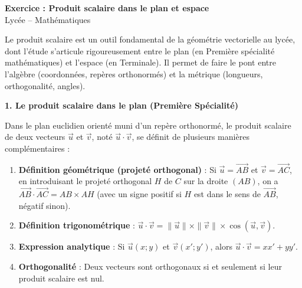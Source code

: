 \documentclass[11pt,a4paper]{article}
\begin{document}
\begin{center}
  {\LARGE \textbf{Exercice : Produit scalaire dans le plan et espace}}\\[0.5em]
  {\large Lycée -- Mathématiques}
\end{center}

Le produit scalaire est un outil fondamental de la géométrie vectorielle au lycée, dont l'étude s'articule rigoureusement entre le plan (en Première spécialité mathématiques) et l'espace (en Terminale). Il permet de faire le pont entre l'algèbre (coordonnées, repères orthonormés) et la métrique (longueurs, orthogonalité, angles).

\vspace{0.35cm}\noindent\textbf{\large 1. Le produit scalaire dans le plan (Première Spécialité)}\par\vspace{0.15cm}
Dans le plan euclidien orienté muni d'un repère orthonormé, le produit scalaire de deux vecteurs $\vec{u}$ et $\vec{v}$, noté $\vec{u} \cdot \vec{v}$, se définit de plusieurs manières complémentaires :
\begin{enumerate}
  \item \textbf{Définition géométrique (projeté orthogonal)} : Si $\vec{u} = \overrightarrow{AB}$ et $\vec{v} = \overrightarrow{AC}$, en introduisant le projeté orthogonal $H$ de $C$ sur la droite $(AB)$, on a $\overrightarrow{AB} \cdot \overrightarrow{AC} = AB \times AH$ (avec un signe positif si $H$ est dans le sens de $\vec{AB}$, négatif sinon).
  \item \textbf{Définition trigonométrique} : $\vec{u} \cdot \vec{v} = \|\vec{u}\| \times \|\vec{v}\| \times \cos(\vec{u}, \vec{v})$.
  \item \textbf{Expression analytique} : Si $\vec{u}(x ; y)$ et $\vec{v}(x' ; y')$, alors $\vec{u} \cdot \vec{v} = xx' + yy'$.
  \item \textbf{Orthogonalité} : Deux vecteurs sont orthogonaux si et seulement si leur produit scalaire est nul.
\end{enumerate}
\end{document}
